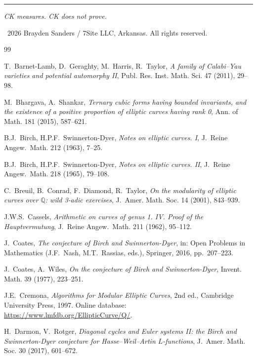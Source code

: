 \documentclass[11pt]{article}
\begin{document}
\bigskip
\hrule
\bigskip
\noindent\textit{CK measures.  CK does not prove.}

\bigskip
\noindent
\textcopyright\ 2026 Brayden Sanders / 7Site LLC, Arkansas.  All rights reserved.


\begin{thebibliography}{99}

T.~Barnet-Lamb, D.~Geraghty, M.~Harris, R.~Taylor,
\textit{A family of Calabi--Yau varieties and potential automorphy II},
Publ. Res. Inst. Math. Sci. 47 (2011), 29--98.

M.~Bhargava, A.~Shankar,
\textit{Ternary cubic forms having bounded invariants, and the existence
of a positive proportion of elliptic curves having rank 0},
Ann. of Math. 181 (2015), 587--621.

B.J.~Birch, H.P.F.~Swinnerton-Dyer,
\textit{Notes on elliptic curves. I},
J.~Reine Angew.~Math. 212 (1963), 7--25.

B.J.~Birch, H.P.F.~Swinnerton-Dyer,
\textit{Notes on elliptic curves. II},
J.~Reine Angew.~Math. 218 (1965), 79--108.

C.~Breuil, B.~Conrad, F.~Diamond, R.~Taylor,
\textit{On the modularity of elliptic curves over $\mathbb{Q}$:
wild 3-adic exercises},
J.~Amer. Math. Soc. 14 (2001), 843--939.

J.W.S.~Cassels,
\textit{Arithmetic on curves of genus 1. IV. Proof of the
Hauptvermutung},
J.~Reine Angew.~Math. 211 (1962), 95--112.

J.~Coates,
\textit{The conjecture of Birch and Swinnerton-Dyer},
in: Open Problems in Mathematics (J.F.~Nash, M.T.~Rassias, eds.),
Springer, 2016, pp.~207--223.

J.~Coates, A.~Wiles,
\textit{On the conjecture of Birch and Swinnerton-Dyer},
Invent. Math. 39 (1977), 223--251.

J.E.~Cremona,
\textit{Algorithms for Modular Elliptic Curves},
2nd ed., Cambridge University Press, 1997.
Online database: \url{https://www.lmfdb.org/EllipticCurve/Q/}.

H.~Darmon, V.~Rotger,
\textit{Diagonal cycles and Euler systems II: the Birch and
Swinnerton-Dyer conjecture for Hasse--Weil--Artin $L$-functions},
J.~Amer. Math. Soc. 30 (2017), 601--672.


\end{thebibliography}
\end{document}
